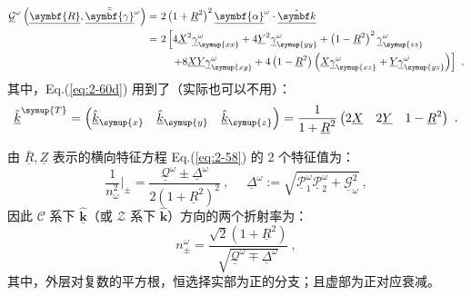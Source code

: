 \begin{subequations}
\begin{align}
	\underline{\mathcal{G}}^{\omega}\left(\underline{\symbf{R}}, \bar{\bar{\underline{\symbf{\gamma}}}}^{\omega}\right) =\ &2\left(1+\underline{R}^{2}\right)^{2} {\underline{\symbf {\alpha}}^\omega} \cdot \underline{\hat{\symbf k}} \label{eq:2-60d}\\ = \ &2\left[4 \underline{X}^{2} \underline{\gamma}^{\omega}_{\symup{x x}}+4 \underline{Y}^{2} \underline{\gamma}^{\omega}_{\symup{y y}}+\left(1-\underline{R}^{2}\right)^{2} \underline{\gamma}^{\omega}_{\symup{z z}}\right. \notag\\ \ &\left.\quad+8 \underline{X} \underline{Y} \underline{\gamma}^{\omega}_{\symup{x y}}+4\left(1-\underline{R}^{2}\right)\left(\underline{X} \underline{\gamma}^{\omega}_{\symup{x z}}+\underline{Y} \underline{\gamma}^{\omega}_{\symup{y z}}\right)\right] \notag~,
\end{align}
\end{subequations}
其中，Eq.(\ref{eq:2-60d}) 用到了（实际也可以不用）：
\begin{equation} \label{eq:2-61}
	\hat{\underline{k}}^{\symup{T}} = \begin{pmatrix} \hat{\underline{k}}_{\symup{x}} & \hat{\underline{k}}_{\symup{y}} & \hat{\underline{k}}_{\symup{z}} \end{pmatrix} = \frac{ 1 }{ 1+\underline{R}^2 } \begin{pmatrix} 2\underline{X} & 2\underline{Y} & 1-\underline{R}^2 \end{pmatrix} ~.
\end{equation}

由 $\bar{\underline{R}}, \underline{Z}$ 表示的横向特征方程 Eq.(\ref{eq:2-58}) 的 2 个特征值为：
\begin{equation} \label{eq:2-62}
	\frac{ 1 }{ n^2_\omega } \Bigg|_\pm = \frac{ \underline{\mathcal{Q}}^{\omega} \pm \underline{\Delta}^\omega }{ 2\left( 1+\underline{R}^2 \right)^2 } ~,\ \ \ \ \ \  \underline{\Delta}^\omega := \sqrt{\underline{\mathcal{P}}^{\omega}_1 \underline{\mathcal{P}}^{\omega}_2 + \underline{\mathcal{G}}_{\omega}^2} ~,
\end{equation}
因此 $\mathcal{C}$ 系下 $\hat{\underline{\symbf k}}$（或 $\mathcal{Z}$ 系下 $\hat{\symbf k}$）方向的两个折射率为：
\begin{equation} \label{eq:2-63}
	n^{\omega}_{\pm} = \frac{ \sqrt{ 2 }\left( 1+\underline{R}^2 \right) }{ \sqrt{\underline{\mathcal{Q}}^{\omega} \mp \underline{\Delta}^\omega} } ~,
\end{equation}
其中，外层对复数的平方根，恒选择实部为正的分支；且虚部为正对应衰减。

